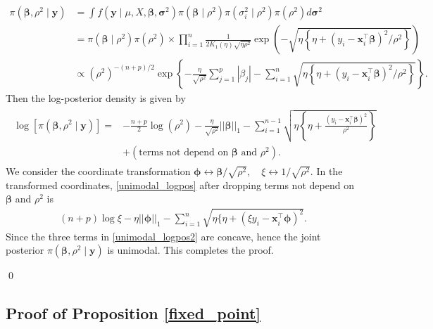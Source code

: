 \documentclass[11pt]{article}
\theoremstyle{plain}
\theoremstyle{definition}
\begin{document}
\begin{align*}
\pi(\bm\beta,\rho^{2}\mid\bm{y})
&=\int f(\bm{y} \mid \mu,X,\bm{\beta},\bm{\sigma}^2 )\pi(\bm{\beta} \mid \rho^2)\pi(\sigma_i^2 \mid \rho^2)\pi(\rho^2)d\bm{\sigma}^{2}\\
&=\pi(\bm{\beta} \mid \rho^2)\pi(\rho^2)\times\prod_{i=1}^{n} \frac{1}{2K_1(\eta)\sqrt{\eta \rho^2}} \exp\left(-\sqrt{\eta \left\{\eta+(y_i-\bm{x}_i^{\top}\bm{\beta})^2/\rho^2\right\}}\right)\\
&\propto(\rho^{2})^{-(n+p)/2}\exp\left\{ -\frac{\eta}{\sqrt{\rho^{2}}}\sum_{j=1}^{p}|\beta_{j}|-\sum_{i=1}^{n}\sqrt{\eta \left\{\eta+(y_i-\bm{x}_i^{\top}\bm{\beta})^2/\rho^2\right\}}\right\}.
\end{align*}
Then the log-posterior density is given by
\begin{align}\label{unimodal_logpos}
\begin{split}
\log[\pi(\bm\beta,\rho^{2}\mid \bm{y})]=& -\frac{n+p}{2}\log(\rho^{2})-\frac{\eta}{\sqrt{\rho^{2}}}||\bm\beta||_{1}-\sum_{i=1}^{n-1}\sqrt{\eta \left\{\eta+\frac{(y_i-\bm{x}_i^{\top}\bm{\beta})^2}{\rho^2}\right\}}\\
&+(\text{terms not depend on $\bm\beta$ and $\rho^{2}$}).
\end{split}
\end{align}
We consider the coordinate transformation $\bm{\phi}\leftrightarrow\bm{\beta}/\sqrt{\rho^2},\quad \xi\leftrightarrow1/\sqrt{\rho^2}$.  
In the transformed coordinates, \eqref{unimodal_logpos} after dropping terms not depend on $\bm\beta$ and $\rho^{2}$ is 
\begin{align}\label{unimodal_logpos2}
(n+p)\log \xi-\eta||\bm\phi||_{1}-\sum_{i=1}^{n}\sqrt{\eta\{\eta+(\xi y_i-\bm{x}_i^{\top}\bm{\phi})^2}.
\end{align}
Since the three terms in \eqref{unimodal_logpos2} are concave, hence the joint posterior $\pi(\bm\beta,\rho^{2}\mid \bm{y})$ is unimodal. This completes the proof.

\qed

\subsection*{Proof of Proposition \ref{fixed_point}}
\end{document}
